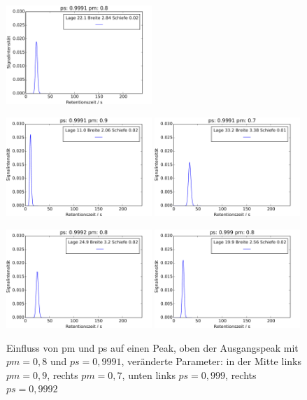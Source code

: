 \begin{figure}[H]
\begin{center}
\includegraphics[width=0.49\textwidth]{bilder/2s_einzeleinfluss/2s_t20}
\end{center}
\includegraphics[width=0.49\textwidth]{bilder/2s_einzeleinfluss/2s_t20_pmp}
\includegraphics[width=0.49\textwidth]{bilder/2s_einzeleinfluss/2s_t20_pmm}

\vspace*{5pt}

\includegraphics[width=0.49\textwidth]{bilder/2s_einzeleinfluss/2s_t20_psp}
\includegraphics[width=0.49\textwidth]{bilder/2s_einzeleinfluss/2s_t20_psm}
\caption[Einfluss von pm und ps auf einen Peak]{Einfluss von pm und ps auf einen Peak, oben der Ausgangspeak mit $pm = 0,8$ und $ps = 0,9991$, veränderte Parameter: in der Mitte links $pm = 0,9$, rechts $pm = 0,7$, unten links $ps = 0,999$, rechts $ps = 0,9992$ }
\label{2s_t20_change}
\end{figure}

